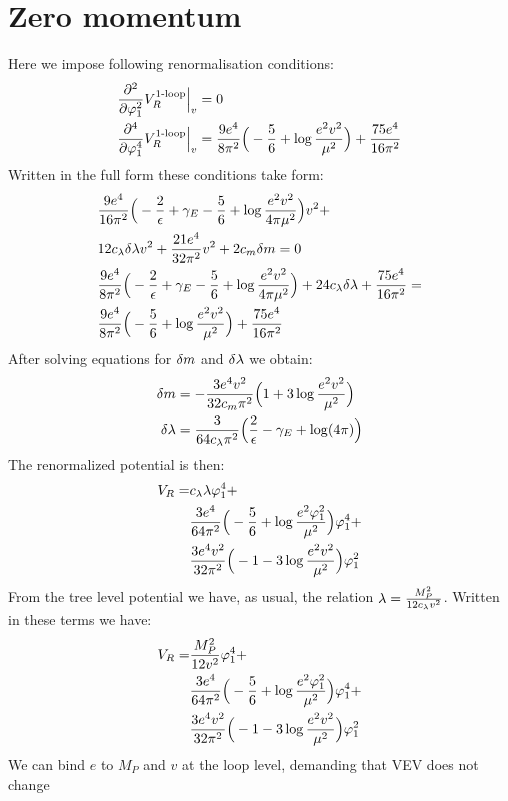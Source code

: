 \section{Zero momentum}
Here we impose following renormalisation conditions:
\begin{align}
\frac{\partial^2 }{\partial \varphi_1^2}V_R^{\textrm{1-loop}}\Big|_{v} &= 0 \\
\frac{\partial^4 }{\partial \varphi_1^4}V_R^{\textrm{1-loop}}\Big|_{v} &= \frac{9e^4}{8\pi^2}\Big(-\frac{5}{6}+\log\frac{e^2
v^2}{\mu^2}\Big)
+\frac{75e^4}{16\pi^2}
\end{align}
Written in the full form these conditions take form:
\begin{align}
&\frac{9e^4}{16\pi^2}\Big(-\frac{2}{\epsilon}+\gamma_E-\frac{5}{6}+\log\frac{e^2
v^2}{4\pi\mu^2}\Big)v^2+ \notag\\
& 12c_\lambda\delta\lambda v^2+\frac{21e^4}{32\pi^2}v^2+2c_m\delta m = 0 \\
&\frac{9e^4}{8\pi^2}\Big(-\frac{2}{\epsilon}+\gamma_E-\frac{5}{6}+\log\frac{e^2v^2}{4\pi\mu^2}\Big)+
24c_\lambda\delta\lambda+\frac{75e^4}{16\pi^2} = \notag \\
&\frac{9e^4}{8\pi^2}\Big(-\frac{5}{6}+\log\frac{e^2v^2}{\mu^2}\Big)+\frac{75e^4}{16\pi^2}
\end{align}
After solving equations for $\delta m$ and $\delta\lambda$ we obtain:
\begin{align}
\delta m &= -\frac{3e^4v^2}{32c_m\pi^2}\Big(1+3
\log\frac{e^2v^2}{\mu^2}\Big) \\
\delta\lambda &= \frac{3}{64c_\lambda\pi^2}\Big(\frac{2}{\epsilon}-\gamma_E+\log(4\pi)\Big)
\end{align}
The renormalized potential is then:
\begin{align}
V_R = &c_\lambda\lambda\varphi_1^4 + \notag \\ 
&\frac{3e^4}{64\pi^2}\Big(-\frac{5}{6}+\log\frac{e^2\varphi_1^2}{\mu^2}\Big)\varphi_1^4+ \notag\\
&\frac{3e^4v^2}{32\pi^2}\Big(-1-3\log\frac{e^2v^2}{\mu^2}\Big)\varphi_1^2
\end{align}
From the tree level potential we have, as usual, the relation $\lambda = \frac{M_P^2}{12c_\lambda v^2}$. 
Written in these terms we have:
\begin{align}
V_R = &\frac{M_P^2}{12v^2}\varphi_1^4 + \notag \\ 
&\frac{3e^4}{64\pi^2}\Big(-\frac{5}{6}+\log\frac{e^2\varphi_1^2}{\mu^2}\Big)\varphi_1^4+ \notag\\
&\frac{3e^4v^2}{32\pi^2}\Big(-1-3\log\frac{e^2v^2}{\mu^2}\Big)\varphi_1^2
\end{align}
We can bind $e$ to $M_P$ and $v$ at the loop level, demanding that VEV does not change 
